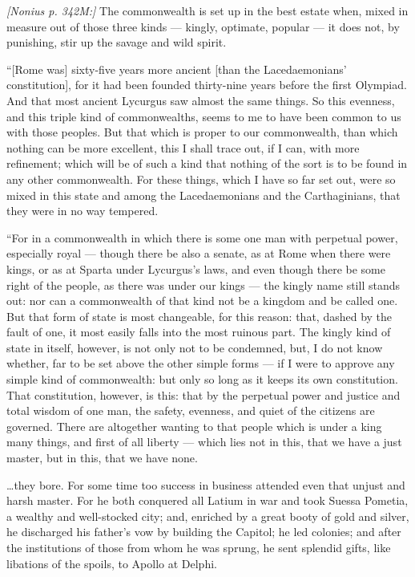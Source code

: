  \textit{[Nonius p. 342M:]} The commonwealth is set up in the best estate when, mixed in measure out of those three kinds --- kingly, optimate, popular --- it does not, by punishing, stir up the savage and wild spirit.

 ``[Rome was] sixty-five years more ancient [than the Lacedaemonians' constitution], for it had been founded thirty-nine years before the first Olympiad. And that most ancient Lycurgus saw almost the same things. So this evenness, and this triple kind of commonwealths, seems to me to have been common to us with those peoples. But that which is proper to our commonwealth, than which nothing can be more excellent, this I shall trace out, if I can, with more refinement; which will be of such a kind that nothing of the sort is to be found in any other commonwealth. For these things, which I have so far set out, were so mixed in this state and among the Lacedaemonians and the Carthaginians, that they were in no way tempered.

 ``For in a commonwealth in which there is some one man with perpetual power, especially royal --- though there be also a senate, as at Rome when there were kings, or as at Sparta under Lycurgus's laws, and even though there be some right of the people, as there was under our kings --- the kingly name still stands out: nor can a commonwealth of that kind not be a kingdom and be called one. But that form of state is most changeable, for this reason: that, dashed by the fault of one, it most easily falls into the most ruinous part. The kingly kind of state in itself, however, is not only not to be condemned, but, I do not know whether, far to be set above the other simple forms --- if I were to approve any simple kind of commonwealth: but only so long as it keeps its own constitution. That constitution, however, is this: that by the perpetual power and justice and total wisdom of one man, the safety, evenness, and quiet of the citizens are governed. There are altogether wanting to that people which is under a king many things, and first of all liberty --- which lies not in this, that we have a just master, but in this, that we have none.

 \ldots they bore. For some time too success in business attended even that unjust and harsh master. For he both conquered all Latium in war and took Suessa Pometia, a wealthy and well-stocked city; and, enriched by a great booty of gold and silver, he discharged his father's vow by building the Capitol; he led colonies; and after the institutions of those from whom he was sprung, he sent splendid gifts, like libations of the spoils, to Apollo at Delphi.


